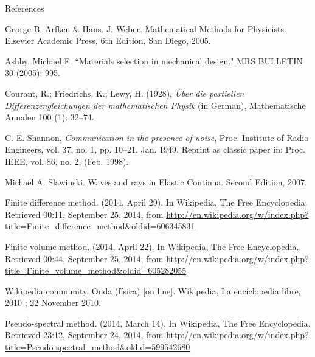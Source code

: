 \documentclass{beamer}
\begin{document}
\begin{frame}[allowframebreaks]{References}
\def\newblock{}

\begin{thebibliography}{1}

 George B. Arfken \& Hans. J. Weber. Mathematical Methods for Physicists. Elsevier Academic Press, 6th Edition, San Diego, 2005.

 Ashby, Michael F. ``Materials
selection in mechanical design." MRS BULLETIN 30 (2005): 995.

 Courant, R.; Friedrichs, K.; Lewy, H. (1928), \emph{\"Uber
die partiellen Differenzengleichungen der mathematischen Physik} (in
German), Mathematische Annalen 100 (1): 32--74.

 C. E. Shannon, \emph{Communication in the presence
of noise}, Proc. Institute of Radio Engineers, vol. 37, no. 1, pp.
10--21, Jan. 1949. Reprint as classic paper in: Proc. IEEE, vol. 86,
no. 2, (Feb. 1998).

 Michael A. Slawinski. Waves and rays in Elastic Continua. Second Edition, 2007.
 
 Finite difference method. (2014, April 29). In Wikipedia, The Free Encyclopedia. Retrieved 00:11, September 25, 2014, from \url{http://en.wikipedia.org/w/index.php?title=Finite_difference_method&oldid=606345831}

 Finite volume method. (2014, April 22). In Wikipedia, The Free Encyclopedia. Retrieved 00:44, September 25, 2014, from \url{http://en.wikipedia.org/w/index.php?title=Finite_volume_method&oldid=605282055}
 
 Wikipedia community. Onda (f\'isica) [on line]. Wikipedia, La enciclopedia libre, 2010 ; 22 November 2010.

 Pseudo-spectral method. (2014, March 14). In Wikipedia, The Free Encyclopedia. Retrieved 23:12, September 24, 2014, from \url{http://en.wikipedia.org/w/index.php?title=Pseudo-spectral_method&oldid=599542680}

\end{thebibliography}

\end{frame}
\end{document}
